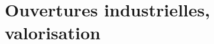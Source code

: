 \documentclass[ twoside,openright,titlepage,numbers=noenddot,headinclude,%
                footinclude=true,cleardoublepage=empty,abstractoff, %
                BCOR=5mm,paper=a4,fontsize=11pt,%
                french,american,%
                ]{scrreprt}
\begin{document}
\section{Ouvertures industrielles, valorisation}


\cleardoublepage

\appendix
\cleardoublepage


\end{document}
